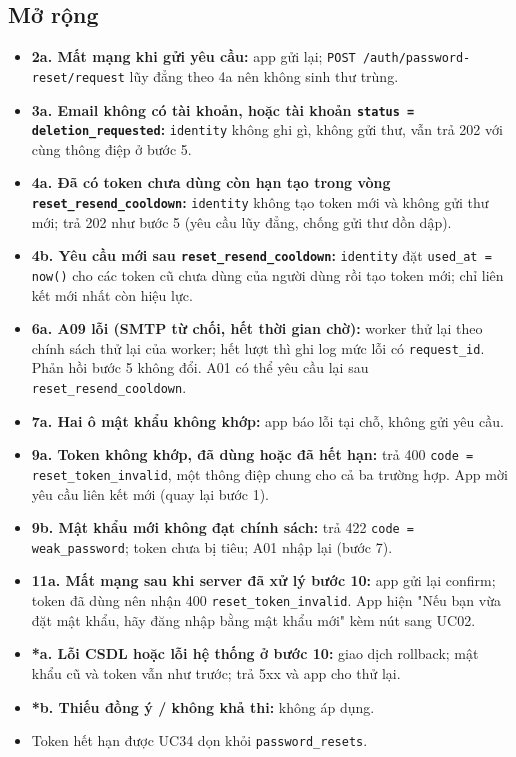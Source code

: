 \subsection{Mở rộng}
\begin{itemize}
\item \textbf{2a. Mất mạng khi gửi yêu cầu:} app gửi lại; {\small\texttt{POST /\allowbreak{}\allowbreak{}auth/\allowbreak{}\allowbreak{}password-\allowbreak{}reset/\allowbreak{}\allowbreak{}request}} lũy đẳng theo 4a nên không sinh thư trùng.
\item \textbf{3a. Email không có tài khoản, hoặc tài khoản {\small\texttt{status = deletion\_\allowbreak{}\allowbreak{}requested}}:} {\small\texttt{identity}} không ghi gì, không gửi thư, vẫn trả 202 với cùng thông điệp ở bước 5.
\item \textbf{4a. Đã có token chưa dùng còn hạn tạo trong vòng {\small\texttt{reset\_\allowbreak{}\allowbreak{}resend\_\allowbreak{}\allowbreak{}cooldown}}:} {\small\texttt{identity}} không tạo token mới và không gửi thư mới; trả 202 như bước 5 (yêu cầu lũy đẳng, chống gửi thư dồn dập).
\item \textbf{4b. Yêu cầu mới sau {\small\texttt{reset\_\allowbreak{}\allowbreak{}resend\_\allowbreak{}\allowbreak{}cooldown}}:} {\small\texttt{identity}} đặt {\small\texttt{used\_\allowbreak{}\allowbreak{}at = now()}} cho các token cũ chưa dùng của người dùng rồi tạo token mới; chỉ liên kết mới nhất còn hiệu lực.
\item \textbf{6a. A09 lỗi (SMTP từ chối, hết thời gian chờ):} worker thử lại theo chính sách thử lại của worker; hết lượt thì ghi log mức lỗi có {\small\texttt{request\_\allowbreak{}\allowbreak{}id}}. Phản hồi bước 5 không đổi. A01 có thể yêu cầu lại sau {\small\texttt{reset\_\allowbreak{}\allowbreak{}resend\_\allowbreak{}\allowbreak{}cooldown}}.
\item \textbf{7a. Hai ô mật khẩu không khớp:} app báo lỗi tại chỗ, không gửi yêu cầu.
\item \textbf{9a. Token không khớp, đã dùng hoặc đã hết hạn:} trả 400 {\small\texttt{code = reset\_\allowbreak{}\allowbreak{}token\_\allowbreak{}\allowbreak{}invalid}}, một thông điệp chung cho cả ba trường hợp. App mời yêu cầu liên kết mới (quay lại bước 1).
\item \textbf{9b. Mật khẩu mới không đạt chính sách:} trả 422 {\small\texttt{code = weak\_\allowbreak{}\allowbreak{}password}}; token chưa bị tiêu; A01 nhập lại (bước 7).
\item \textbf{11a. Mất mạng sau khi server đã xử lý bước 10:} app gửi lại confirm; token đã dùng nên nhận 400 {\small\texttt{reset\_\allowbreak{}\allowbreak{}token\_\allowbreak{}\allowbreak{}invalid}}. App hiện "Nếu bạn vừa đặt mật khẩu, hãy đăng nhập bằng mật khẩu mới" kèm nút sang UC02.
\item \textbf{*a. Lỗi CSDL hoặc lỗi hệ thống ở bước 10:} giao dịch rollback; mật khẩu cũ và token vẫn như trước; trả 5xx và app cho thử lại.
\item \textbf{*b. Thiếu đồng ý /\allowbreak{} không khả thi:} không áp dụng.
\item Token hết hạn được UC34 dọn khỏi {\small\texttt{password\_\allowbreak{}\allowbreak{}resets}}.
\end{itemize}
